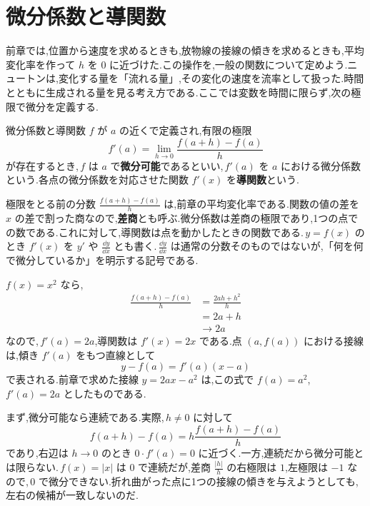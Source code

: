 \section{微分係数と導関数}\label{節:微分定義}
前章では,位置から速度を求めるときも,放物線の接線の傾きを求めるときも,平均変化率を作って $h$ を $0$ に近づけた.この操作を,一般の関数について定めよう.ニュートンは,変化する量を「流れる量」,その変化の速度を流率として扱った.時間とともに生成される量を見る考え方である.ここでは変数を時間に限らず,次の極限で微分を定義する.

\begin{definition}{微分係数と導関数}
$f$ が $a$ の近くで定義され,有限の極限
\[
 f'(a)=\lim_{h\to0}\frac{f(a+h)-f(a)}h
\]
が存在するとき,\,$f$ は $a$ で\textbf{微分可能}であるといい,\,$f'(a)$ を $a$ における微分係数という.各点の微分係数を対応させた関数 $f'(x)$ を\textbf{導関数}という.
\end{definition}

極限をとる前の分数 $\frac{f(a+h)-f(a)}h$ は,前章の平均変化率である.関数の値の差を $x$ の差で割った商なので,\textbf{差商}とも呼ぶ.微分係数は差商の極限であり,1つの点での数である.これに対して,導関数は点を動かしたときの関数である.\,$y=f(x)$ のとき $f'(x)$ を $y'$ や $\frac{\dd y}{\dd x}$ とも書く.\,$\frac{\dd y}{\dd x}$ は通常の分数そのものではないが,「何を何で微分しているか」を明示する記号である.

$f(x)=x^2$ なら,
\begin{align*}
 \frac{f(a+h)-f(a)}h
 &=\frac{2ah+h^2}h\\
 &=2a+h\\
 &\longrightarrow2a
\end{align*}
なので,\,$f'(a)=2a$,導関数は $f'(x)=2x$ である.点 $(a,f(a))$ における接線は,傾き $f'(a)$ をもつ直線として
\[
 y-f(a)=f'(a)(x-a)
\]
で表される.前章で求めた接線 $y=2ax-a^2$ は,この式で $f(a)=a^2$,\,$f'(a)=2a$ としたものである.

まず,微分可能なら連続である.実際,\,$h\ne0$ に対して
\[
 f(a+h)-f(a)
 =h\frac{f(a+h)-f(a)}h
\]
であり,右辺は $h\to0$ のとき $0\cdot f'(a)=0$ に近づく.一方,連続だから微分可能とは限らない.\,$f(x)=|x|$ は $0$ で連続だが,差商 $\frac{|h|}{h}$ の右極限は $1$,左極限は $-1$ なので,\,$0$ で微分できない.折れ曲がった点に1つの接線の傾きを与えようとしても,左右の候補が一致しないのだ.

%
